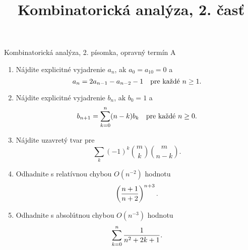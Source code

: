 \documentclass[a4paper, 12pt]{article}
\title{Kombinatorická analýza, 2. časť}
\date{}
\begin{document}
\centerline{Kombinatorická analýza, 2. písomka, opravný termín A}

\begin{enumerate}
\item
Nájdite explicitné vyjadrenie $a_n$, ak $a_0=a_{10}=0$ a
$$
a_n = 2a_{n-1}-a_{n-2}-1\quad\hbox{pre každé $n\ge 1$}.
$$

\item
Nájdite explicitné vyjadrenie $b_n$, ak $b_0=1$ a
$$
b_{n+1} = \sum_{k=0}^n (n-k)b_k\quad\hbox{pre každé $n\ge 0$}.
$$


\item
Nájdite uzavretý tvar pre
$$
\sum_k (-1)^k{m\choose k}{m\choose n-k}.
$$

\item
Odhadnite s relatívnou chybou $O(n^{-2})$ hodnotu
$$
\left({n+1\over n+2}\right)^{n+3}.
$$

\item
Odhadnite s absolútnou chybou $O(n^{-3})$ hodnotu
$$
\sum_{k=0}^n {1\over n^2+2k+1}.
$$

\end{enumerate}
\end{document}
